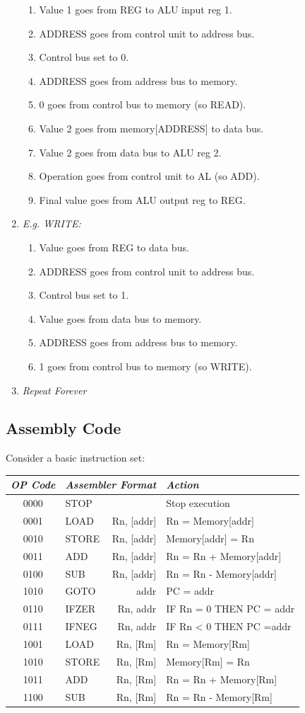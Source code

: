 \documentclass[twocolumn,english]{article}
\providecommand{\tabularnewline}{\\}
\begin{document}
\begin{enumerate}
\begin{enumerate}
\item Value 1 goes from REG to ALU input reg 1.
\item ADDRESS goes from control unit to address bus.
\item Control bus set to 0.
\item ADDRESS goes from address bus to memory.
\item 0 goes from control bus to memory (so READ).
\item Value 2 goes from memory{[}ADDRESS{]} to data bus.
\item Value 2 goes from data bus to ALU reg 2.
\item Operation goes from control unit to AL (so ADD).
\item Final value goes from ALU output reg to REG.
\end{enumerate}
\item \emph{E.g. WRITE:}

\begin{enumerate}
\item Value goes from REG to data bus.
\item ADDRESS goes from control unit to address bus.
\item Control bus set to 1.
\item Value goes from data bus to memory.
\item ADDRESS goes from address bus to memory.
\item 1 goes from control bus to memory (so WRITE).
\end{enumerate}
\item \emph{Repeat Forever}
\end{enumerate}

\subsection{Assembly Code}

Consider a basic instruction set:

\begin{table}[H]
\noindent \centering{}%
\begin{tabular}{clrl}
\toprule 
\emph{OP Code} & \multicolumn{2}{c}{\emph{Assembler Format}} & \emph{Action}\tabularnewline
\midrule
0000 & STOP &  & Stop execution\tabularnewline
0001 & LOAD & Rn, {[}addr{]} & Rn = Memory{[}addr{]}\tabularnewline
0010 & STORE & Rn, {[}addr{]} & Memory{[}addr{]} = Rn\tabularnewline
0011 & ADD & Rn, {[}addr{]} & Rn = Rn + Memory{[}addr{]}\tabularnewline
0100 & SUB & Rn, {[}addr{]} & Rn = Rn - Memory{[}addr{]}\tabularnewline
1010 & GOTO & addr & PC = addr\tabularnewline
0110 & IFZER & Rn, addr & IF Rn = 0 THEN PC = addr\tabularnewline
0111 & IFNEG & Rn, addr & IF Rn \textless{} 0 THEN PC =addr\tabularnewline
1001 & LOAD & Rn, {[}Rm{]} & Rn = Memory{[}Rm{]}\tabularnewline
1010 & STORE & Rn, {[}Rm{]} & Memory{[}Rm{]} = Rn\tabularnewline
1011 & ADD & Rn, {[}Rm{]} & Rn = Rn + Memory{[}Rm{]}\tabularnewline
1100 & SUB & Rn, {[}Rm{]} & Rn = Rn - Memory{[}Rm{]}\tabularnewline
\bottomrule
\end{tabular}
\end{table}
\end{document}
